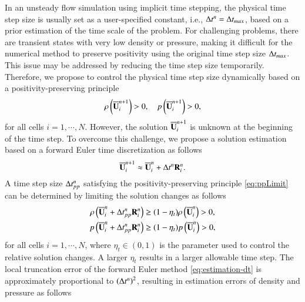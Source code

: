 In an unsteady flow simulation using implicit time stepping, the physical time step size is usually set as a user-specified constant, i.e., $\mathrm\Delta t^n= \mathrm\Delta t_{max}$, based on a prior estimation of the time scale of the problem. For challenging problems, there are transient states with very low density or pressure, making it difficult for the numerical method to preserve positivity using the original time step size $\mathrm\Delta t_{max}$.
This issue may be addressed by reducing the time step size temporarily. Therefore, we propose to control the physical time step size dynamically based on a positivity-preserving principle
\begin{equation}
    \label{eq:ppLimit}
    \rho\left(\overline{\mathbf{U}}_i^{n+1} \right)  >0, \quad
    p\left(\overline{\mathbf{U}}_i^{n+1}\right) > 0 ,
\end{equation}
for all cells $i=1, \cdots,N$.
However, the solution $\overline{\mathbf{U}}_i^{n+1}$ is unknown at the beginning of the time step. To overcome this challenge, we propose a solution estimation based on a forward Euler time discretization as follows
\begin{equation}
    \label{eq:estimation-dt}
    \overline{\mathbf{U}}_i^{n+1} \approx  \overline{\mathbf{U}}_i^n + \mathrm\Delta t^{n}  \mathbf{R}_i^n.
\end{equation}
A time step size $\mathrm\Delta t^{n}_{pp}$ satisfying the positivity-preserving principle \eqref{eq:ppLimit} can be determined by limiting the solution changes as follows
\begin{equation}
    \label{eq:ppLimitDt}
    \begin{aligned}
        \rho\left(\overline{\mathbf{U}}_i^n + \mathrm\Delta t^{n}_{pp}\mathbf{R}_i^n\right)
         & \geq
        (1- \eta_t)
        \rho\left(\overline{\mathbf{U}}_i^n\right)
        >  0, 
         \\
        p\left(\overline{\mathbf{U}}_i^n + \mathrm\Delta t^{n}_{pp}\mathbf{R}_i^n\right)
         & \geq
        (1- \eta_t)
        p\left(\overline{\mathbf{U}}_i^n\right)
        >  0,
    \end{aligned}
\end{equation}
for all cells $i=1, \cdots,N$, where $\eta_t\in(0,1)$ is the parameter used to control the relative solution changes. A larger $\eta_t$ results in a larger allowable time step. The local truncation error of the forward Euler method \eqref{eq:estimation-dt} is approximately proportional to $\left(\mathrm\Delta t^{n}\right)^2$, resulting in estimation errors of density and pressure as follows 
